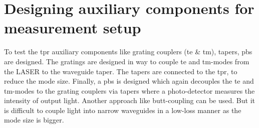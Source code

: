 \documentclass[../report.tex]{subfiles}
\begin{document}
\begin{comment}

		\subsection{Design B: Tapered Si waveguide with horizontal gradual asymmetry on SOI with air cladding based on mode evolution}

\subsubsection{Optimized dimensions of bus waveguide}
		
\begin{figure}[H] %
	\begin{subfigure}[t]{0.45\textwidth}
		\texttt{[image: 3-mode1-200-200]}
		\caption{\gls{te} mode in the cross-section}
		\label{fig:3_mode1_200_200}
	\end{subfigure}
	\hfill
	\begin{subfigure}[t]{0.45\textwidth}
		\texttt{[image: 3-mode2-200-200]}
		\caption{\gls{tm} mode in the cross-section}
		\label{fig:3_mode2_200_200}
	\end{subfigure}
	\caption{Hybrid modes in the cross-section with width = 200nm, height = 220nm, obtained using Comsol 2-D simulation}
\end{figure}

\subsubsection{Optimized dimensions of MEMS waveguide}	

\subsubsection{Device tolerance}

\subsubsection{Representational design based on simulation}
\end{comment}

\section{Designing auxiliary components for measurement setup}
To test the \gls{tpr} auxiliary components like grating couplers (\gls{te} \& \gls{tm}), tapers, \gls{pbs} are designed. The gratings are designed in way to couple \gls{te} and \gls{tm}-modes from the LASER to the waveguide taper. The tapers are connected to the \gls{tpr}, to reduce the mode size. Finally, a \gls{pbs} is designed which again decouples the \gls{te} and \gls{tm}-modes to the grating couplers via tapers where a photo-detector measures the intensity of output light. Another approach like butt-coupling can be used. But it is difficult to couple light into narrow waveguides in a low-loss manner as the mode size is bigger.  
\end{document}
